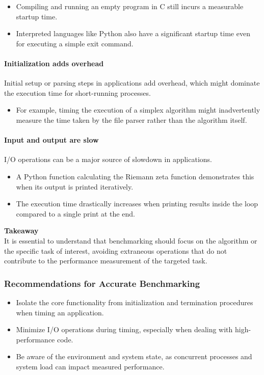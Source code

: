 \documentclass[12pt]{article}
\begin{document}
\begin{itemize}
    \item Compiling and running an empty program in C still incurs a measurable startup time.
    \item Interpreted languages like Python also have a significant startup time even for executing a simple exit command.
\end{itemize}


\paragraph{Initialization adds overhead}
Initial setup or parsing steps in applications add overhead, which might dominate the execution time for short-running processes.

\begin{itemize}
    \item For example, timing the execution of a simplex algorithm might inadvertently measure the time taken by the file parser rather than the algorithm itself.
\end{itemize}

\paragraph{Input and output are slow}
I/O operations can be a major source of slowdown in applications.

\begin{itemize}
    \item A Python function calculating the Riemann zeta function demonstrates this when its output is printed iteratively.
    \item The execution time drastically increases when printing results inside the loop compared to a single print at the end.
\end{itemize}

\textbf{Takeaway}\\
It is essential to understand that benchmarking should focus on the algorithm or the specific task of interest, avoiding extraneous operations that do not contribute to the performance measurement of the targeted task.

\subsubsection{Recommendations for Accurate Benchmarking}
\begin{itemize}
    \item Isolate the core functionality from initialization and termination procedures when timing an application.
    \item Minimize I/O operations during timing, especially when dealing with high-performance code.
    \item Be aware of the environment and system state, as concurrent processes and system load can impact measured performance.
\end{itemize}
\end{document}
